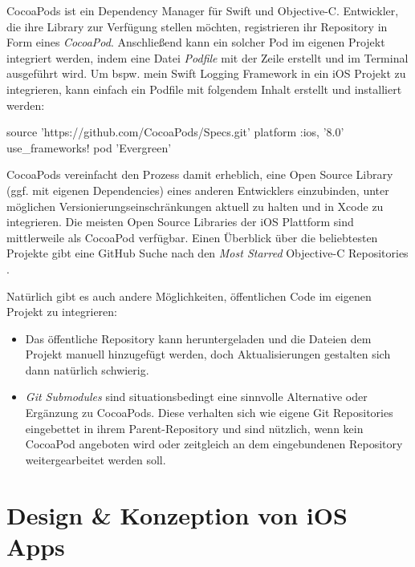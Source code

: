 \documentclass[parskip=half, final]{scrreprt}
\begin{document}
CocoaPods ist ein Dependency Manager für Swift und Objective-C. Entwickler, die ihre Library zur Verfügung stellen möchten, registrieren ihr Repository in Form eines \emph{CocoaPod}. Anschließend kann ein solcher Pod im eigenen Projekt integriert werden, indem eine Datei \emph{Podfile} mit der Zeile  erstellt und im Terminal  ausgeführt wird. Um bspw. mein Swift Logging Framework   in ein iOS Projekt zu integrieren, kann einfach ein Podfile mit folgendem Inhalt erstellt und installiert werden:

\begin{shcode}
source 'https://github.com/CocoaPods/Specs.git'
platform :ios, '8.0'
use_frameworks!
pod 'Evergreen'	
\end{shcode}

CocoaPods vereinfacht den Prozess damit erheblich, eine Open Source Library (ggf. mit eigenen Dependencies) eines anderen Entwicklers einzubinden, unter möglichen Versionierungseinschränkungen aktuell zu halten und in Xcode zu integrieren. Die meisten Open Source Libraries der iOS Plattform sind mittlerweile als CocoaPod verfügbar. Einen Überblick über die beliebtesten Projekte gibt eine GitHub Suche nach den \emph{Most Starred} Objective-C Repositories .

Natürlich gibt es auch andere Möglichkeiten, öffentlichen Code im eigenen Projekt zu integrieren:

\begin{itemize}
\item Das öffentliche Repository kann heruntergeladen und die Dateien dem Projekt manuell hinzugefügt werden, doch Aktualisierungen gestalten sich dann natürlich schwierig.
\item \emph{Git Submodules}  sind situationsbedingt eine sinnvolle Alternative oder Ergänzung zu CocoaPods. Diese verhalten sich wie eigene Git Repositories eingebettet in ihrem Parent-Repository und sind nützlich, wenn kein CocoaPod angeboten wird oder zeitgleich an dem eingebundenen Repository weitergearbeitet werden soll.
\end{itemize}


\section{Design \& Konzeption von iOS Apps}
\end{document}
